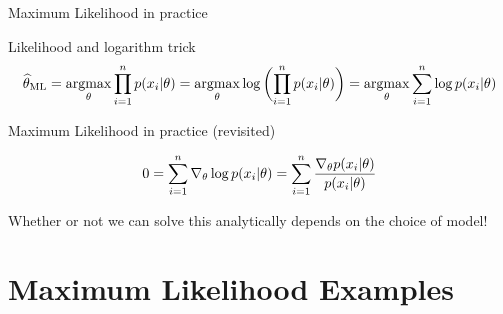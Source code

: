 \documentclass[10pt]{beamer}
\begin{document}
\begin{frame}{Maximum Likelihood in practice}


\begin{sblock}{Likelihood and logarithm trick}
\[  \widehat{\theta}_{\text{ML}} = \operatorname*{argmax}_\theta \displaystyle\prod_{i=1}^n p(x_i | \theta) = \operatorname*{argmax}_\theta \log \bigg( { \displaystyle\prod_{i=1}^n p(x_i | \theta)} \bigg) = \operatorname*{argmax}_\theta \displaystyle\sum_{i=1}^n \log p(x_i | \theta)  \]
\end{sblock}

\begin{sblock}{Maximum Likelihood in practice (revisited)}

\[ 0 = \displaystyle\sum_{i=1}^n \nabla_\theta \log p(x_i | \theta) = \displaystyle\sum_{i=1}^n \displaystyle\frac{\nabla_\theta p(x_i |\theta) }{p(x_i |\theta)} \]

Whether or not we can solve this analytically depends on the choice of model!
\end{sblock}

\end{frame}


\section{Maximum Likelihood Examples}
\end{document}
